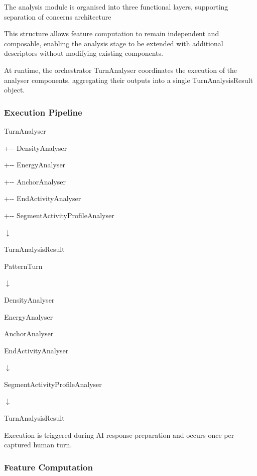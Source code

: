 The analysis module is organised into three functional layers,
supporting separation of concerns architecture

This structure allows feature computation to remain independent and
composable, enabling the analysis stage to be extended with additional
descriptors without modifying existing components.

At runtime, the orchestrator TurnAnalyser coordinates the execution of
the analyser components, aggregating their outputs into a single
TurnAnalysisResult object.

\subsubsection{Execution Pipeline}\label{execution-pipeline}

TurnAnalyser

\textbar{}

+-\/- DensityAnalyser

+-\/- EnergyAnalyser

+-\/- AnchorAnalyser

+-\/- EndActivityAnalyser

+-\/- SegmentActivityProfileAnalyser

\(\downarrow\)

TurnAnalysisResult

PatternTurn

\(\downarrow\)

DensityAnalyser

EnergyAnalyser

AnchorAnalyser

EndActivityAnalyser

\(\downarrow\)

SegmentActivityProfileAnalyser

\(\downarrow\)

TurnAnalysisResult



Execution is triggered during AI response preparation and occurs once
per captured human turn.

\subsubsection{Feature Computation}\label{feature-computation}

